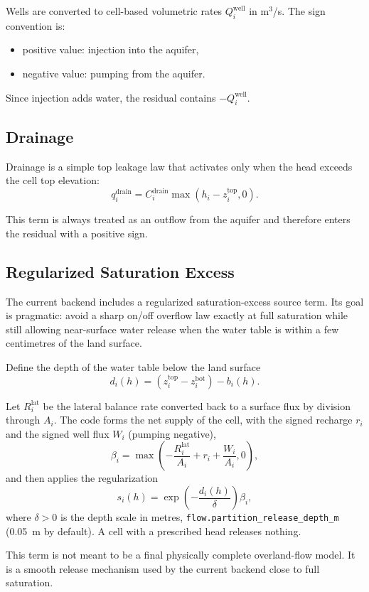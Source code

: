 \documentclass[11pt,a4paper]{article}
\begin{document}
Wells are converted to cell-based volumetric rates $Q^{\text{well}}_i$ in m$^3$/s.
The sign convention is:

\begin{itemize}
\item positive value: injection into the aquifer,
\item negative value: pumping from the aquifer.
\end{itemize}

Since injection adds water, the residual contains $-Q^{\text{well}}_i$.

\subsection{Drainage}

Drainage is a simple top leakage law that activates only when the head exceeds
the cell top elevation:
\[
q^{\text{drain}}_i = C_i^{\text{drain}}
\max(h_i - z^{\text{top}}_i, 0).
\]

This term is always treated as an outflow from the aquifer and therefore enters
the residual with a positive sign.

\subsection{Regularized Saturation Excess}

The current backend includes a regularized saturation-excess source term. Its
goal is pragmatic: avoid a sharp on/off overflow law exactly at full saturation
while still allowing near-surface water release when the water table is within a
few centimetres of the land surface.

Define the depth of the water table below the land surface
\[
d_i(h) = \left(z^{\text{top}}_i - z^{\text{bot}}_i\right) - b_i(h).
\]

Let $R^{\text{lat}}_i$ be the lateral balance rate converted back to a surface
flux by division through $A_i$. The code forms the net supply of the cell, with
the signed recharge $r_i$ and the signed well flux $W_i$ (pumping negative),
\[
\beta_i
=
\max\!\left(
    -\frac{R^{\text{lat}}_i}{A_i} + r_i + \frac{W_i}{A_i},
    0
\right),
\]
and then applies the regularization
\[
s_i(h)
=
\exp\!\left(
    -\frac{d_i(h)}{\delta}
\right)
\beta_i,
\]
where $\delta > 0$ is the depth scale in metres,
\texttt{flow.partition\_release\_depth\_m} (0.05~m by default). A cell with a
prescribed head releases nothing.

This term is not meant to be a final physically complete overland-flow model.
It is a smooth release mechanism used by the current backend close to full
saturation.
\end{document}
